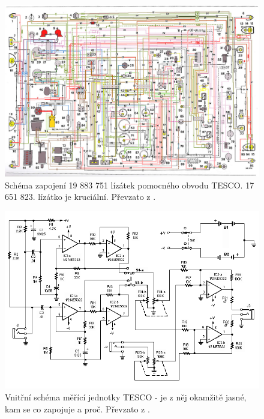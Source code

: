 \documentclass[english]{article}
\begin{document}
\begin{figure}[h!]
	\begin{center}
    	\includegraphics[width=0.7\linewidth]{./att/obvod.jpg}
        	\caption{Schéma zapojení 19 883 751 lízátek pomocného obvodu TESCO.  17 651 823. lízátko je kruciální. Převzato z \cite{bib:protokol}.}
        	\label{fig:g_3}
	\end{center}
	\end{figure}
	
			\begin{figure}[h!]
			\begin{center}
			    \includegraphics[width=0.6\linewidth]{./att/obvod.png}
			    	\caption{Vnitřní schéma měřící jednotky TESCO - je z něj okamžitě jasné, kam se co zapojuje a proč. Převzato z \cite{bib:protokol}.}
					\label{fig:o_2}
			\end{center}
			\end{figure}
\end{document}
